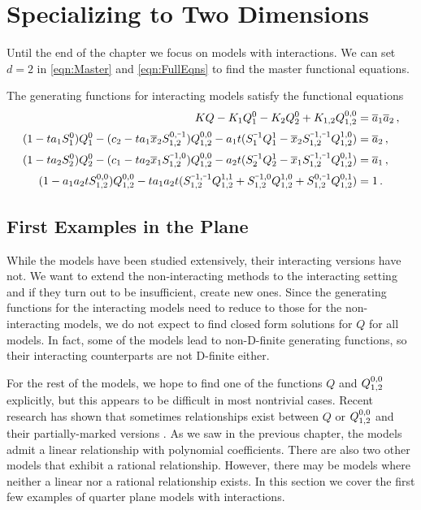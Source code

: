 \section{Specializing to Two Dimensions}
Until the end of the chapter we focus on \twoD models with interactions. We can set $d=2$ in \autoref{eqn:Master} and \autoref{eqn:FullEqns} to find the \twoD master functional equations.

\begin{cor} The generating functions for \classic interacting \twoD models satisfy the functional equations
\begin{align}
	\begin{split}
	KQ - K_1 Q_1^0 - K_2 Q_2^0 + K_{1,2} \Qf{0,0} &= \ol a_1\ol a_2\,,\\
		(1-ta_1 S_1^0)Q_1^0 - (c_2-ta_1\ol x_2S_{1,2}^{0,\um 1})Q_{1,2}^{0,0} - a_1 t(S_1^{\um 1}Q_1^1-\ol x_2S_{1,2}^{\um 1,\um 1}Q_{1,2}^{1,0}) &=\ol a_2\,,\\
		(1-ta_2 S_2^0)Q_2^0 - (c_1-ta_2\ol x_1S_{1,2}^{\um 1,0})Q_{1,2}^{0,0} -a_2t(S_2^{\um 1}Q_2^1-\ol x_1S_{1,2}^{\um 1,\um 1}Q_{1,2}^{0,1}) &=\ol a_1\,,\\
		(1-a_1 a_2 t \Sf{0,0})Q_{1,2}^{0,0} - ta_1a_2t(\Sf{\um 1,\um 1}\Qf{1,1} + \Sf{\um 1,0}\Qf{1,0} + \Sf{0,\um 1}\Qf{0,1})&= 1\,.
	\end{split}
\end{align}
\end{cor}

\subsection{First Examples in the Plane}

While the \classic \twoD models have been studied extensively, their interacting versions have not. We want to extend the non-interacting methods to the interacting setting and if they turn out to be insufficient, create new ones. Since the generating functions for the interacting models need to reduce to those for the non-interacting models, we do not expect to find closed form solutions for $Q$ for all models. In fact, some of the \classic models lead to non-D-finite generating functions, so their interacting counterparts are not D-finite either. 

For the rest of the models, we hope to find one of the functions $Q$ and $Q_{1,2}^{0,0}$ explicitly, but this appears to be difficult in most nontrivial cases. Recent research has shown that sometimes relationships exist between $Q$ or $Q_{1,2}^{0,0}$ and their partially-marked versions \cite{tabbara2014exact}. As we saw in the previous chapter, the \oneD models admit a linear relationship with polynomial coefficients. There are also two other \twoD models that exhibit a rational relationship. However, there may be models where neither a linear nor a rational relationship exists. In this section we cover the first few examples of quarter plane models with interactions.

